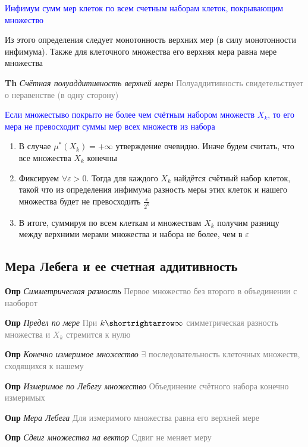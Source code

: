 \textcolor{blue}{Инфимум сумм мер клеток по всем счетным наборам клеток, покрывающим множество}

Из этого определения следует монотонность верхних мер (в силу монотонности инфимума).
Также для клеточного множества его верхняя мера равна мере множества

\textbf{Th} \textit{Счётная полуаддитивность верхней меры} \textcolor{gray}{Полуаддитивность свидетельствует о
неравенстве (в одну сторону)}

\textcolor{blue}{Если множестыво покрыто не более чем счётным набором множеств $X_k$, то его мера не превосходит суммы
мер всех множеств из набора}

\begin{enumerate}
    \item В случае $\mu^*(X_k) = +\infty$ утверждение очевидно.
    Иначе будем считать, что все множества $X_k$ конечны
    \item Фиксируем $\forall \varepsilon > 0$.
    Тогда для каждого $X_k$ найдётся счётный набор клеток, такой что из определения инфимума разность меры этих клеток и
    нашего множества будет не превосходить $\frac{\varepsilon}{2^k}$
    \item В итоге, суммируя по всем клеткам и множествам $X_k$ получим разницу между верхними мерами множества и
    набора не более, чем в $\varepsilon$
\end{enumerate}

\subsection{Мера Лебега и ее счетная аддитивность}

\textbf{Опр} \textit{Симметрическая разность} \textcolor{gray}{Первое множество без второго в объединении с наоборот}

\textbf{Опр} \textit{Предел по мере} \textcolor{gray}{При $k \shortrightarrow \infty$ симметрическая разность
множества и $X_k$ стремится к нулю}

\textbf{Опр} \textit{Конечно измеримое множество} \textcolor{gray}{$\exists$ последовательность клеточных множеств, сходящихся к нашему}

\textbf{Опр} \textit{Измеримое по Лебегу множество} \textcolor{gray}{Объединение счётного набора конечно измеримых}

\textbf{Опр} \textit{Мера Лебега} \textcolor{gray}{Для измеримого множества равна его верхней мере}

\textbf{Опр} \textit{Сдвиг множества на вектор} \textcolor{gray}{Сдвиг не меняет меру}

